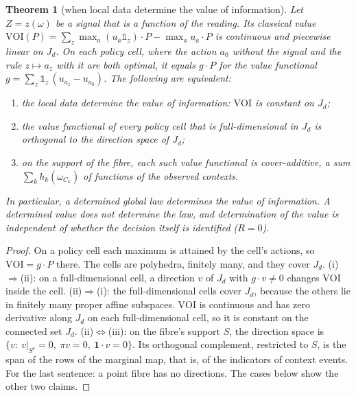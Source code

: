 \documentclass[11pt]{article}
\newtheorem{theorem}{Theorem}\newtheorem{proposition}[theorem]{Proposition}\newtheorem{lemma}[theorem]{Lemma}\newtheorem{corollary}[theorem]{Corollary}\newtheorem{conjecture}[theorem]{Conjecture}\crefname{conjecture}{Conjecture}{Conjectures}
\theoremstyle{definition}\newtheorem{definition}[theorem]{Definition}\newtheorem{remark}[theorem]{Remark}\newtheorem{example}[theorem]{Example}\newtheorem{problem}[theorem]{Open problem}\crefname{problem}{Problem}{Problems}
\begin{document}
\begin{theorem}[when local data determine the value of information]\label{thm:determination}
Let $Z=z(\omega)$ be a signal that is a function of the reading. Its classical value $\mathrm{VOI}(P)=\sum_z\max_a(u_a\mathbb 1_{z})\cdot P-\max_au_a\cdot P$ is continuous and piecewise linear on $J_d$. On each \emph{policy cell}, where the action $a_0$ without the signal and the rule $z\mapsto a_z$ with it are both optimal, it equals $g\cdot P$ for the \emph{value functional} $g=\sum_z\mathbb 1_z\,(u_{a_z}-u_{a_0})$. The following are equivalent:
\begin{enumerate}
\item[(i)] the local data determine the value of information: $\mathrm{VOI}$ is constant on $J_d$;
\item[(ii)] the value functional of every policy cell that is full-dimensional in $J_d$ is orthogonal to the direction space of $J_d$;
\item[(iii)] on the support of the fibre, each such value functional is \emph{cover-additive}, a sum $\sum_kh_k(\omega_{C_k})$ of functions of the observed contexts.
\end{enumerate}
In particular, a determined global law determines the value of information. A determined value does not determine the law, and determination of the value is independent of whether the decision itself is identified ($R=0$).
\end{theorem}

\begin{proof}
On a policy cell each maximum is attained by the cell's actions, so $\mathrm{VOI}=g\cdot P$ there. The cells are polyhedra, finitely many, and they cover $J_d$. (i)$\Rightarrow$(ii): on a full-dimensional cell, a direction $v$ of $J_d$ with $g\cdot v\ne0$ changes $\mathrm{VOI}$ inside the cell. (ii)$\Rightarrow$(i): the full-dimensional cells cover $J_d$, because the others lie in finitely many proper affine subspaces. $\mathrm{VOI}$ is continuous and has zero derivative along $J_d$ on each full-dimensional cell, so it is constant on the connected set $J_d$. (ii)$\Leftrightarrow$(iii): on the fibre's support $S$, the direction space is $\{v:\ v|_{S^c}=0,\ \pi v=0,\ \mathbf 1\cdot v=0\}$. Its orthogonal complement, restricted to $S$, is the span of the rows of the marginal map, that is, of the indicators of context events. For the last sentence: a point fibre has no directions. The cases below show the other two claims.
\end{proof}
\end{document}
